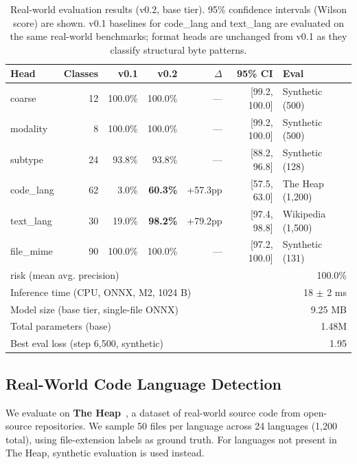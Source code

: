 \documentclass[11pt,a4paper]{article}
\begin{document}
\begin{table}[h]
\centering
\begin{tabular}{lrrrrrl}
\toprule
Head & Classes & v0.1 & v0.2 & $\Delta$ & 95\% CI & Eval \\
\midrule
coarse      & 12 & 100.0\% & 100.0\% & --- & {[}99.2, 100.0{]} & Synthetic (500) \\
modality    & 8  & 100.0\% & 100.0\% & --- & {[}99.2, 100.0{]} & Synthetic (500) \\
subtype     & 24 & 93.8\%  & 93.8\%  & --- & {[}88.2, 96.8{]} & Synthetic (128) \\
code\_lang  & 62 &  3.0\%  & \textbf{60.3\%} & +57.3pp & {[}57.5, 63.0{]} & The Heap (1,200) \\
text\_lang  & 30 & 19.0\%  & \textbf{98.2\%} & +79.2pp & {[}97.4, 98.8{]} & Wikipedia (1,500) \\
file\_mime  & 90 & 100.0\% & 100.0\% & --- & {[}97.2, 100.0{]} & Synthetic (131) \\
\midrule
\multicolumn{5}{l}{risk (mean avg. precision)} & \multicolumn{2}{r}{100.0\%} \\
\multicolumn{5}{l}{Inference time (CPU, ONNX, M2, 1024 B)} & \multicolumn{2}{r}{18 $\pm$ 2 ms} \\
\multicolumn{5}{l}{Model size (base tier, single-file ONNX)} & \multicolumn{2}{r}{9.25 MB} \\
\multicolumn{5}{l}{Total parameters (base)} & \multicolumn{2}{r}{1.48M} \\
\multicolumn{5}{l}{Best eval loss (step 6,500, synthetic)} & \multicolumn{2}{r}{1.95} \\
\bottomrule
\end{tabular}
\caption{\label{tab:results} Real-world evaluation results (v0.2, base tier). 95\% confidence intervals (Wilson score) are shown. v0.1 baselines for code\_lang and text\_lang are evaluated on the same real-world benchmarks; format heads are unchanged from v0.1 as they classify structural byte patterns.}
\end{table}

\subsection{Real-World Code Language Detection}

We evaluate on \textbf{The Heap}~\cite{theheap}, a dataset of real-world source code from open-source repositories.
We sample 50 files per language across 24 languages (1,200 total), using file-extension labels as ground truth.
For languages not present in The Heap, synthetic evaluation is used instead.
\end{document}
